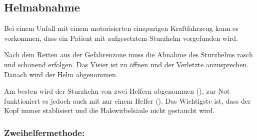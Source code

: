 % 
% 



\subsection{Helmabnahme}

Bei einem Unfall mit einem motorisierten einspurigen Kraftfahrzeug kann es
vorkommen, dass ein Patient mit aufgesetztem Sturzhelm vorgefunden wird. 

Nach dem Retten aus der Gefahrenzone muss die Abnahme des
Sturzhelms rasch und schonend erfolgen. Das Visier ist zu
öffnen und der Verletzte anzusprechen. Danach wird der Helm
abgenommen.


Am besten wird der Sturzhelm von zwei Helfern abgenommen
(), zur Not funktioniert es jedoch auch mit nur einem
Helfer (). Das Wichtigste ist, dass
der Kopf immer stablisiert und die Halswirbelsäule nicht gestaucht wird.

\subsubsection{Zweihelfermethode:}

